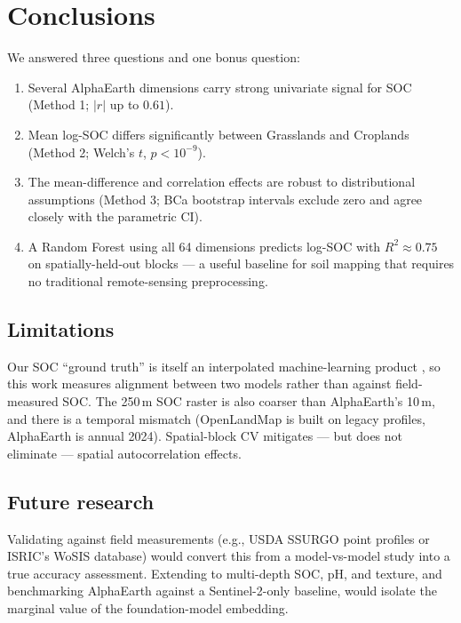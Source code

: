 \documentclass[11pt]{article}
\begin{document}
\section{Conclusions}
We answered three questions and one bonus question:
\begin{enumerate}
\item Several AlphaEarth dimensions carry strong univariate signal for
SOC (Method 1; $|r|$ up to $0.61$).
\item Mean log-SOC differs significantly between Grasslands and Croplands
(Method 2; Welch's $t$, $p < 10^{-9}$).
\item The mean-difference and correlation effects are robust to
distributional assumptions (Method 3; BCa bootstrap intervals exclude zero
and agree closely with the parametric CI).
\item A Random Forest using all 64 dimensions predicts log-SOC with
$R^2 \approx 0.75$ on spatially-held-out blocks --- a useful baseline for
soil mapping that requires no traditional remote-sensing preprocessing.
\end{enumerate}

\subsection{Limitations}
Our SOC ``ground truth'' is itself an interpolated machine-learning product
\cite{hengl2017openlandmap}, so this work measures alignment between two
models rather than against field-measured SOC. The 250\,m SOC raster is
also coarser than AlphaEarth's 10\,m, and there is a temporal mismatch
(OpenLandMap is built on legacy profiles, AlphaEarth is annual 2024).
Spatial-block CV mitigates --- but does not eliminate --- spatial
autocorrelation effects.

\subsection{Future research}
Validating against field measurements (e.g., USDA SSURGO point profiles or
ISRIC's WoSIS database) would convert this from a model-vs-model study into
a true accuracy assessment. Extending to multi-depth SOC, pH, and texture,
and benchmarking AlphaEarth against a Sentinel-2-only baseline, would
isolate the marginal value of the foundation-model embedding.



\end{document}
